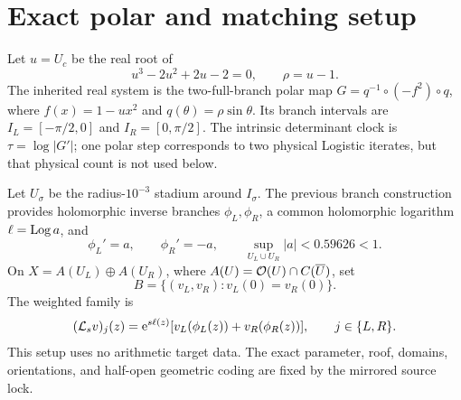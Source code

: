 \section{Exact polar and matching setup}
Let \(u=U_c\) be the real root of
\[
u^3-2u^2+2u-2=0,\qquad \rho=u-1.
\]
The inherited real system is the two-full-branch polar map
\(G=q^{-1}\circ(-f^2)\circ q\), where \(f(x)=1-ux^2\) and
\(q(\theta)=\rho\sin\theta\). Its branch intervals are
\(I_L=[-\pi/2,0]\) and \(I_R=[0,\pi/2]\). The intrinsic determinant
clock is \(\tau=\log|G'|\); one polar step corresponds to two physical
Logistic iterates, but that physical count is not used below.

Let \(U_\sigma\) be the radius-\(10^{-3}\) stadium around \(I_\sigma\).
The previous branch construction provides holomorphic inverse branches
\(\phi_L,\phi_R\), a common holomorphic logarithm \(\ell=\operatorname{Log} a\), and
\[
 \phi_L'=a,\qquad \phi_R'=-a,\qquad
 \sup_{U_L\cup U_R}|a|<0.59626<1.
\]
On \(X=A(U_L)\oplus A(U_R)\), where
\(A(U)=\mathcal{O}(U)\cap C(\overline U)\), set
\[
 B=\{(v_L,v_R):v_L(0)=v_R(0)\}.
\]
The weighted family is
\[
 (\mathcal{L}_s v)_j(z)=\mathrm{e}^{s\ell(z)}
 [v_L(\phi_L(z))+v_R(\phi_R(z))],\qquad j\in\{L,R\}.
\]
This setup uses no arithmetic target data. The exact parameter, roof,
domains, orientations, and half-open geometric coding are fixed by the
mirrored source lock.
